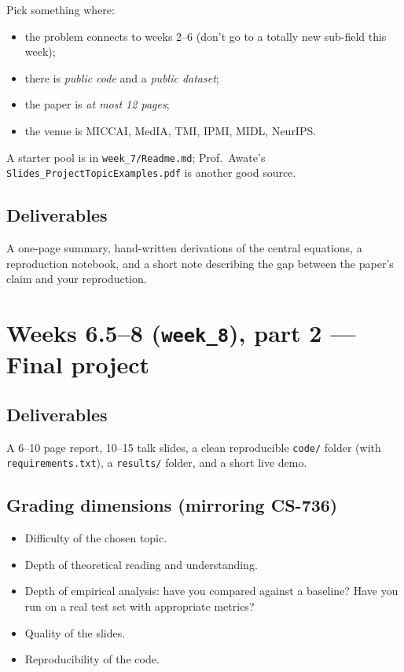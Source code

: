 \documentclass[11pt,a4paper]{article}
\begin{document}
Pick something where:
\begin{itemize}[leftmargin=*,nosep]
  \item the problem connects to weeks 2--6 (don't go to a totally
        new sub-field this week);
  \item there is \emph{public code} and a \emph{public dataset};
  \item the paper is \emph{at most 12 pages};
  \item the venue is MICCAI, MedIA, TMI, IPMI, MIDL, NeurIPS.
\end{itemize}
A starter pool is in \texttt{week\_7/Readme.md}; Prof.\ Awate's
\texttt{Slides\_ProjectTopicExamples.pdf} is another good source.

\subsection{Deliverables}

A one-page summary, hand-written derivations of the central
equations, a reproduction notebook, and a short note describing the
gap between the paper's claim and your reproduction.

\section{Weeks 6.5--8 (\texttt{week\_8}), part 2 --- Final project}

\subsection{Deliverables}

A 6--10 page report, 10--15 talk slides, a clean reproducible
\texttt{code/} folder (with \texttt{requirements.txt}), a
\texttt{results/} folder, and a short live demo.

\subsection{Grading dimensions (mirroring CS-736)}

\begin{itemize}[leftmargin=*,nosep]
  \item Difficulty of the chosen topic.
  \item Depth of theoretical reading and understanding.
  \item Depth of empirical analysis: have you compared against a
        baseline? Have you run on a real test set with appropriate
        metrics?
  \item Quality of the slides.
  \item Reproducibility of the code.
\end{itemize}
\end{document}
